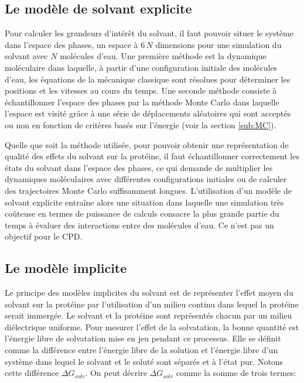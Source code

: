 \subsection{Le modèle de solvant explicite}

Pour calculer les grandeurs d'intérêt du solvant, il faut pouvoir situer le système dans l'espace des phases, un espace à $6\,N$ dimensions pour une simulation du solvant avec $N$ molécules d'eau.
Une première méthode est la dynamique moléculaire dans laquelle, à partir d'une configuration initiale des molécules d'eau, les équations de la mécanique classique sont résolues pour déterminer les positions et les vitesses au cours du temps. Une seconde méthode consiste à échantillonner l'espace des phases par la méthode Monte Carlo dans laquelle l'espace est visité grâce à une série de déplacements aléatoires qui sont acceptés ou non en fonction de critères basés sur l'énergie (voir la section \ref{sub:MC}).

Quelle que soit la méthode utilisée, pour pouvoir obtenir une représentation de qualité des effets du solvant sur la protéine, il faut échantillonner correctement les états du solvant dans l'espace des phases, ce qui demande de multiplier les dynamiques moléculaires avec différentes configurations initiales ou de calculer des trajectoires Monte Carlo suffisamment longues.
L'utilisation d'un modèle de solvant explicite entraîne alors une situation dans laquelle une simulation très coûteuse en termes de puissance de calculs consacre la plus grande partie du temps à évaluer des interactions entre des molécules d'eau. Ce n'est pas un objectif pour le CPD.

\subsection{Le modèle implicite}

Le principe des modèles implicites du solvant est de représenter l'effet moyen du solvant sur la protéine par l'utilisation d'un milieu continu dans lequel la protéine serait immergée. Le solvant et la protéine sont représentés chacun par un milieu diélectrique uniforme.
Pour mesurer l'effet de la solvatation, la bonne quantité est l'énergie libre de solvatation mise en jeu pendant ce processus. Elle se définit comme la différence entre l'énergie libre de la solution et l'énergie libre d'un système dans lequel le solvant et le soluté sont séparés et à l'état pur. Notons cette différence $\Delta G_{solv}$. On peut décrire $\Delta G_{solv}$ comme la somme de trois termes:


